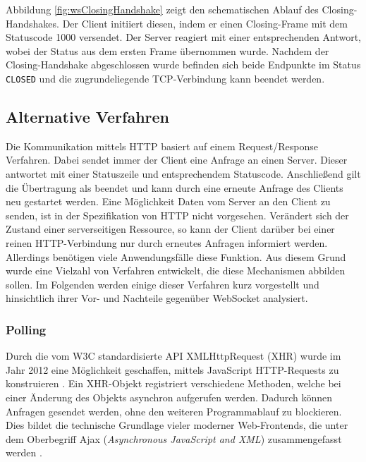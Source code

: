 \documentclass[11pt,a4paper,titlepage]{scrartcl}
\numberwithin{equation}{section}
\begin{document}
\noindent Abbildung \ref{fig:wsClosingHandshake} zeigt den schematischen Ablauf des Closing-Handshakes. Der Client initiiert diesen, indem er einen Closing-Frame mit dem Statuscode 1000 versendet. Der Server reagiert mit einer entsprechenden Antwort, wobei der Status aus dem ersten Frame übernommen wurde. Nachdem der Closing-Handshake abgeschlossen wurde befinden sich beide Endpunkte im Status \texttt{CLOSED} und die zugrundeliegende TCP-Verbindung kann beendet werden.

\subsection{Alternative Verfahren}\label{subsubsec:AlternativeVerfahren}
Die Kommunikation mittels HTTP basiert auf einem Request/Response Verfahren. Dabei sendet immer der Client eine Anfrage an einen Server. Dieser antwortet mit einer Statuszeile und entsprechendem Statuscode. Anschließend gilt die Übertragung als beendet und kann durch eine erneute Anfrage des Clients neu gestartet werden. Eine Möglichkeit Daten vom Server an den Client zu senden, ist in der Spezifikation von HTTP nicht vorgesehen. Verändert sich der Zustand einer serverseitigen Ressource, so kann der Client darüber bei einer reinen HTTP-Verbindung nur durch erneutes Anfragen informiert werden. Allerdings benötigen viele Anwendungsfälle diese Funktion. Aus diesem Grund wurde eine Vielzahl von Verfahren entwickelt, die diese Mechanismen abbilden sollen. Im Folgenden werden einige dieser Verfahren kurz vorgestellt und hinsichtlich ihrer Vor- und Nachteile gegenüber WebSocket analysiert.\\

\subsubsection{Polling}
Durch die vom W3C standardisierte API XMLHttpRequest (XHR) wurde im Jahr 2012 eine Möglichkeit geschaffen, mittels JavaScript HTTP-Requests zu konstruieren \autocite{whatwg_xmlhttprequest_2006}. Ein XHR-Objekt registriert verschiedene Methoden, welche bei einer Änderung des Objekts asynchron aufgerufen werden. Dadurch können Anfragen gesendet werden, ohne den weiteren Programmablauf zu blockieren. Dies bildet die technische Grundlage vieler moderner Web-Frontends, die unter dem Oberbegriff Ajax (\textit{Asynchronous JavaScript and XML}) zusammengefasst werden \autocite[26]{gorski_websockets_2015}. \\
\end{document}
